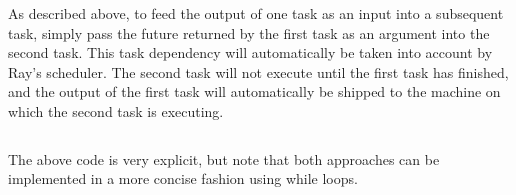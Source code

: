 As described above, to feed the output of one task as an input into a subsequent task, simply pass the future returned by the first task as an argument into the second task. This task dependency will automatically be taken into account by Ray’s scheduler. The second task will not execute until the first task has finished, and the output of the first task will automatically be shipped to the machine on which the second task is executing.

\inputminted{python}{../src/03.ExplicitAggregation.py}

The above code is very explicit, but note that both approaches can be implemented in a more concise fashion using while loops.


\inputminted{python}{../src/04.aggregationConciese.py}
